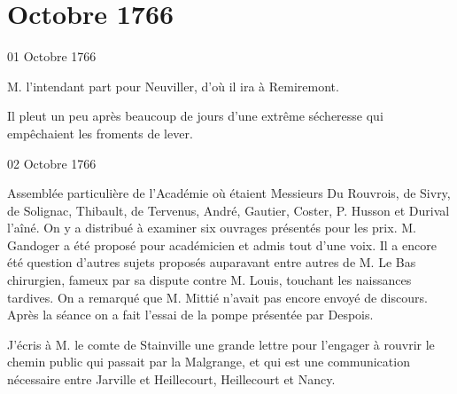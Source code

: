                   \chapter*{Octobre 1766}
                     
                     
                     

                     \begin{diary}{01 Octobre 1766}{}
                        
                         M. l’intendant part pour Neuviller, d’où
                           il ira à Remiremont. \bigskip
        
        
                         Il pleut un peu après beaucoup de
                           jours
                           d’une extrême sécheresse qui empêchaient
                           les froments de lever. \bigskip
        
        
                     \end{diary}

                     \begin{diary}{02 Octobre 1766}{}
                        
                         Assemblée particulière de l’Académie où
                           étaient Messieurs
                           Du Rouvrois, de Sivry, de
                              Solignac, Thibault, de
                           Tervenus, André,
                           Gautier, Coster, P. Husson et
                              Durival l’aîné.
                           On y a distribué à examiner six ouvrages
                           présentés pour les prix. M.
                              Gandoger
                           a été proposé pour académicien et admis
                           tout d’une voix. Il a encore été question
                           d’autres sujets proposés auparavant entre autres
                           de M. Le Bas chirurgien, fameux
                           par sa
                           dispute contre M. Louis, touchant
                           les
                           naissances tardives. On a remarqué
                           que M. Mittié n’avait pas
                           encore envoyé
                           de discours. Après la séance on a fait
                           l’essai de la pompe présentée par Despois. \bigskip
        
        
                         J’écris à M. le comte
                              de Stainville une
                           grande lettre pour l’engager à rouvrir
                           le chemin public qui passait par la
                              Malgrange, et qui est une communication
                           nécessaire entre Jarville
                           et Heillecourt,
                           Heillecourt et Nancy. \bigskip
        
        
                     \end{diary}
                     

